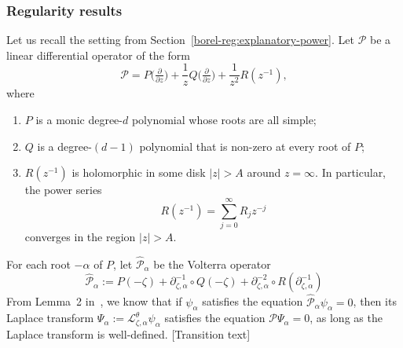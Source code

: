 \documentclass{article}
\newcommand{\C}{\mathbb{C}}
\newcommand{\laplace}{\mathcal{L}}
\theoremstyle{definition}
\theoremstyle{plain}
\newenvironment{todo}{\color{Coral}}{\color{black}}
\begin{document}
\subsubsection{Regularity results}\label{sec:regularity-results}
Let us recall the setting from Section~\ref{borel-reg:explanatory-power}. Let $\mathcal{P}$ be a linear differential operator of the form 
\begin{equation}\label{eqn:operator-P}
\mathcal{P} = P\big(\tfrac{\partial}{\partial z}\big) + \frac{1}{z} Q\big(\tfrac{\partial}{\partial z}\big) + \frac{1}{z^2} R(z^{-1}),
\end{equation}
where
\begin{enumerate}
\item $P$ is a monic degree-$d$ polynomial whose roots are all simple; 
\item $Q$ is a degree-$(d-1)$ polynomial that is non-zero at every root of $P$;
\item $R(z^{-1})$ is holomorphic in some disk $|z| > A$ around $z = \infty$. In particular, the power series
\[ R(z^{-1}) = \sum_{j=0}^\infty R_j z^{-j} \]
converges in the region $|z| > A$.
\end{enumerate}
For each root $-\alpha$ of $P$, let $\hat{\mathcal{P}}_{\alpha}$ be the Volterra operator 
\begin{equation}\label{eq:hat_P}
    \hat{\mathcal{P}}_\alpha:=P(-\zeta)+\partial_{\zeta,\alpha}^{-1}\circ Q(-\zeta)+\partial_{\zeta,\alpha}^{-2}\circ R(\partial_{\zeta,\alpha}^{-1})
\end{equation}
From Lemma~2 in~\cite{reg-sing-volterra}, we know that if $\psi_\alpha$ satisfies the equation $\hat{\mathcal{P}}_\alpha\psi_\alpha=0$, then its Laplace transform $\Psi_\alpha:=\laplace_{\zeta,\alpha}^{\theta}\psi_\alpha$ satisfies the equation $\mathcal{P}\Psi_\alpha=0$, as long as the Laplace transform is well-defined. \begin{todo}[Transition text]\end{todo}
\end{document}
